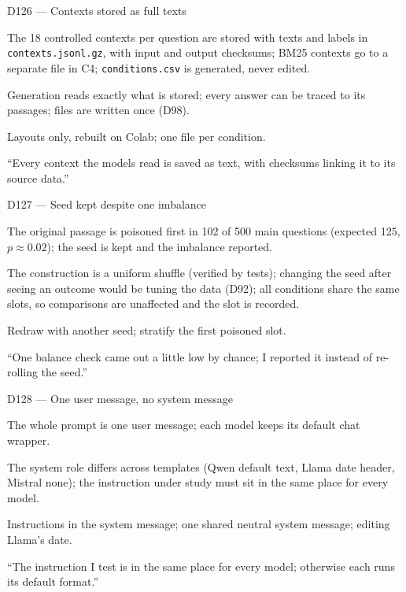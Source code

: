 \documentclass[11pt,a4paper]{report}
\begin{document}
\begin{decisionbox}{D126 --- Contexts stored as full texts}
\begin{description}[nosep, leftmargin=0pt]
  \item[Decision.] The 18 controlled contexts per question are stored with texts and labels in \texttt{contexts.jsonl.gz}, with input and output checksums; BM25 contexts go to a separate file in C4; \texttt{conditions.csv} is generated, never edited.
  \item[Why.] Generation reads exactly what is stored; every answer can be traced to its passages; files are written once (D98).
  \item[Alternatives.] Layouts only, rebuilt on Colab; one file per condition.
  \item[Interview line.] ``Every context the models read is saved as text, with checksums linking it to its source data.''
\end{description}
\end{decisionbox}

\begin{decisionbox}{D127 --- Seed kept despite one imbalance}
\begin{description}[nosep, leftmargin=0pt]
  \item[Decision.] The original passage is poisoned first in 102 of 500 main questions (expected 125, $p \approx 0.02$); the seed is kept and the imbalance reported.
  \item[Why.] The construction is a uniform shuffle (verified by tests); changing the seed after seeing an outcome would be tuning the data (D92); all conditions share the same slots, so comparisons are unaffected and the slot is recorded.
  \item[Alternatives.] Redraw with another seed; stratify the first poisoned slot.
  \item[Interview line.] ``One balance check came out a little low by chance; I reported it instead of re-rolling the seed.''
\end{description}
\end{decisionbox}
\begin{decisionbox}{D128 --- One user message, no system message}
\begin{description}[nosep, leftmargin=0pt]
  \item[Decision.] The whole prompt is one user message; each model keeps its default chat wrapper.
  \item[Why.] The system role differs across templates (Qwen default text, Llama date header, Mistral none); the instruction under study must sit in the same place for every model.
  \item[Alternatives.] Instructions in the system message; one shared neutral system message; editing Llama's date.
  \item[Interview line.] ``The instruction I test is in the same place for every model; otherwise each runs its default format.''
\end{description}
\end{decisionbox}
\end{document}

